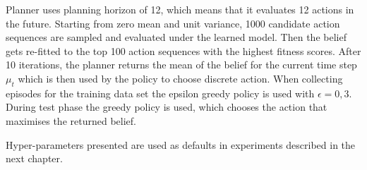Planner uses planning horizon of 12, which means that it evaluates 12 actions in the future. Starting from zero mean and unit variance, 1000 candidate action sequences are sampled and evaluated under the learned model. Then the belief gets re-fitted to the top 100 action sequences with the highest fitness scores. After 10 iterations, the planner returns the mean of the belief for the current time step $\mu_t$ which is then used by the policy to choose discrete action. When collecting episodes for the training data set the epsilon greedy policy is used with $\epsilon = 0,3$. During test phase the greedy policy is used, which chooses the action that maximises the returned belief.

Hyper-parameters presented are used as defaults in experiments described in the next chapter.
